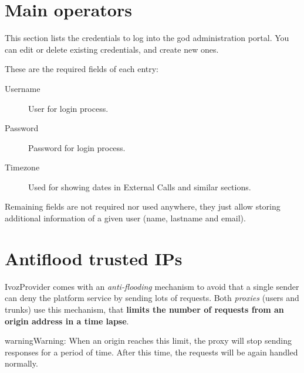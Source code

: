 \documentclass[letterpaper,10pt,english]{sphinxmanual}
\begin{document}
\section{Main operators}
\label{administration_portal/platform/main_operators::doc}\label{administration_portal/platform/main_operators:main-operators}
This section lists the credentials to log into the god administration portal. You can edit or delete existing credentials,
and create new ones.

These are the required fields of each entry:
\begin{description}
\item[{Username}] \leavevmode{}\label{administration_portal/platform/main_operators:term-username}
User for login process.

\item[{Password}] \leavevmode{}\label{administration_portal/platform/main_operators:term-password}
Password for login process.

\item[{Timezone}] \leavevmode{}\label{administration_portal/platform/main_operators:term-timezone}
Used for showing dates in External Calls and similar sections.

\end{description}

Remaining fields are not required nor used anywhere, they just allow storing additional information of a given user
(name, lastname and email).


\section{Antiflood trusted IPs}
\label{administration_portal/platform/antiflood_trusted_ips::doc}\label{administration_portal/platform/antiflood_trusted_ips:antiflood-trusted-ips}\label{administration_portal/platform/antiflood_trusted_ips:id1}
IvozProvider comes with an \emph{anti-flooding} mechanism to avoid that a single
sender can deny the platform service by sending lots of requests. Both \emph{proxies}
(users and trunks) use this mechanism, that \textbf{limits the number of requests
from an origin address in a time lapse}.

\begin{notice}{warning}{Warning:}
When an origin reaches this limit, the proxy will stop sending
responses for a period of time. After this time, the requests will be again
handled normally.
\end{notice}
\end{document}
